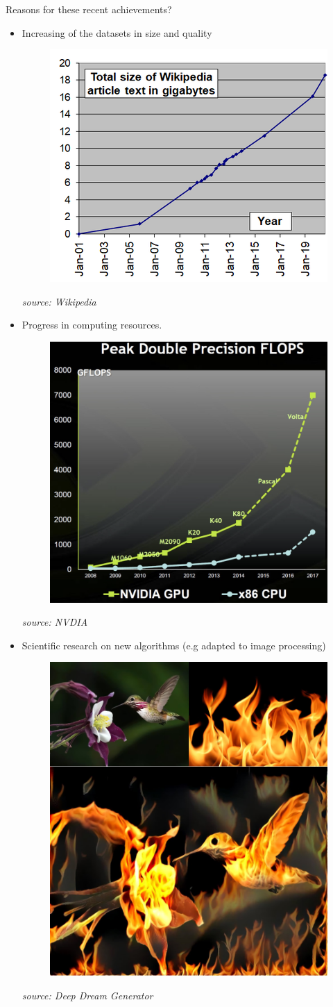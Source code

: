 \documentclass[handout]{beamer}
\newcommand{\rref}[1][]{\hfill{\scriptsize\textit{#1}}}
\begin{document}
\begin{frame}[t]{Reasons for these recent achievements?}
    \begin{itemize}
        \item Increasing of the datasets in size and quality
         {
        \begin{figure}
\includegraphics[width=.6\textwidth]{fig/L1/Wikipedia_article_size_in_gigabytes.png}
\end{figure}
\rref[source: Wikipedia]
}
        \item <2-> Progress in computing resources.
         {
        \begin{figure}
\includegraphics[width=.6\textwidth]{fig/L1/evolution-gpu.png}
\end{figure}
\rref[source: NVDIA]
}        
        
        \item <3-> Scientific research on new algorithms (e.g adapted to image processing)
                 {
        \begin{figure}
\includegraphics[width=.4\textwidth]{fig/L1/deep-art.jpg}
\end{figure}
\rref[source: Deep Dream Generator]

}
\end{itemize}
\end{frame}
\end{document}
